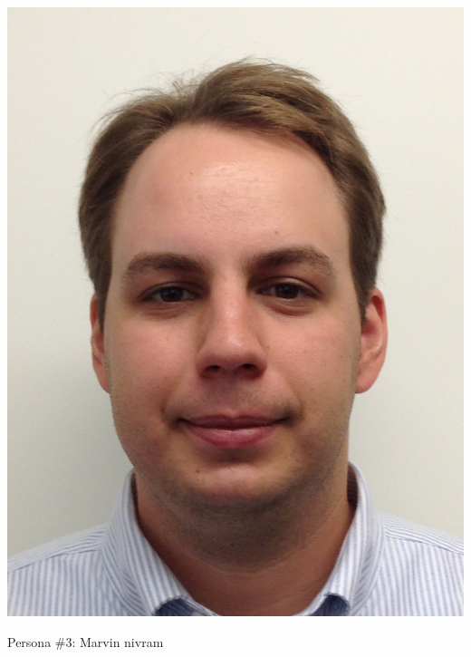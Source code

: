 \documentclass{sigchi-ext}
\begin{document}
\begin{marginfigure}[2pc]
  \begin{minipage}{\marginparwidth}
    \centering
  \includegraphics[width=0.7\marginparwidth]{figures/marvin.png}
    \caption{Persona \#3: Marvin nivram }~\label{fig:marginfig}
  \end{minipage}
\end{marginfigure}
\end{document}
